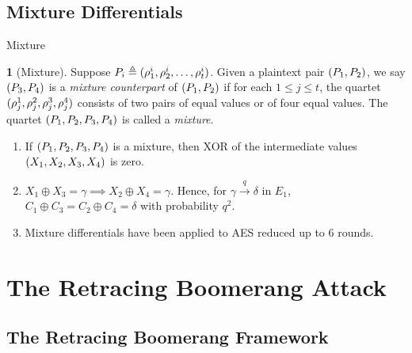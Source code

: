 \documentclass[notheorems]{beamer}
\theoremstyle{definition}
\newtheorem{definition}{\translate{Definition}}
\theoremstyle{example}
\begin{document}
    \subsection{Mixture Differentials}
    \label{subsec:mixture}
    
    \begin{frame}{Mixture}
        \begin{definition}[Mixture]
            \label{def:mixture}
            Suppose \(P_i \triangleq (\rho_1^i, \rho_2^i, \ldots,
            \rho_t^i)\). Given a plaintext pair \((P_1, P_2)\), we say
            \((P_3, P_4)\) is a \emph{mixture counterpart} of \((P_1,
            P_2)\) if for each \(1 \le j \le t\), the quartet \((\rho_j^1,
            \rho_j^2, \rho_j^3, \rho_j^4)\) consists of two pairs of equal
            values or of four equal values. The quartet \((P_1, P_2, P_3,
            P_4)\) is called a \emph{mixture}.
        \end{definition}
        \pause
        \begin{enumerate}
            \item<2-> If \((P_1, P_2, P_3, P_4)\) is a mixture, then XOR of
            the intermediate values \((X_1, X_2, X_3, X_4)\) is zero.
            \item<3-> \(X_1 \oplus X_3 = \gamma \implies X_2 \oplus X_4 =
            \gamma\). Hence, for \(\gamma \xrightarrow{q} \delta\) in \(E_1\),
            \(C_1 \oplus C_3 = C_2 \oplus C_4 = \delta\) with probability
            \(q^2\).
            \item<4-> Mixture differentials have been applied to AES reduced up
            to 6 rounds.
        \end{enumerate}
    \end{frame}

    \section[Retracing Boomerang Attack]{The Retracing Boomerang Attack}
    \label{sec:retr-boomerang}
    
    \subsection{The Retracing Boomerang Framework}
    \label{sec:retr-framework}
\end{document}

